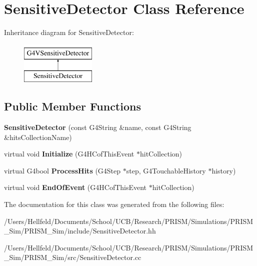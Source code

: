 \hypertarget{class_sensitive_detector}{}\section{Sensitive\+Detector Class Reference}
\label{class_sensitive_detector}
Inheritance diagram for Sensitive\+Detector\+:\begin{figure}[H]
\begin{center}
\leavevmode
\includegraphics[height=2.000000cm]{class_sensitive_detector}
\end{center}
\end{figure}
\subsection*{Public Member Functions}
\begin{DoxyCompactItemize}
\item 
\hypertarget{class_sensitive_detector_ac88a17313a09d79b33525ebd71d0bcfd}{}\label{class_sensitive_detector_ac88a17313a09d79b33525ebd71d0bcfd} 
{\bfseries Sensitive\+Detector} (const G4\+String \&name, const G4\+String \&hits\+Collection\+Name)
\item 
\hypertarget{class_sensitive_detector_ac8d4fb05e49fbd3d7036723cf7c6afe4}{}\label{class_sensitive_detector_ac8d4fb05e49fbd3d7036723cf7c6afe4} 
virtual void {\bfseries Initialize} (G4\+H\+Cof\+This\+Event $\ast$hit\+Collection)
\item 
\hypertarget{class_sensitive_detector_a0d76f2cb50f6b3736e80d0aa99ad8ccd}{}\label{class_sensitive_detector_a0d76f2cb50f6b3736e80d0aa99ad8ccd} 
virtual G4bool {\bfseries Process\+Hits} (G4\+Step $\ast$step, G4\+Touchable\+History $\ast$history)
\item 
\hypertarget{class_sensitive_detector_a158761c11c808dc5e3724f28893e7df1}{}\label{class_sensitive_detector_a158761c11c808dc5e3724f28893e7df1} 
virtual void {\bfseries End\+Of\+Event} (G4\+H\+Cof\+This\+Event $\ast$hit\+Collection)
\end{DoxyCompactItemize}


The documentation for this class was generated from the following files\+:\begin{DoxyCompactItemize}
\item 
/\+Users/\+Hellfeld/\+Documents/\+School/\+U\+C\+B/\+Research/\+P\+R\+I\+S\+M/\+Simulations/\+P\+R\+I\+S\+M\+\_\+\+Sim/\+P\+R\+I\+S\+M\+\_\+\+Sim/include/Sensitive\+Detector.\+hh\item 
/\+Users/\+Hellfeld/\+Documents/\+School/\+U\+C\+B/\+Research/\+P\+R\+I\+S\+M/\+Simulations/\+P\+R\+I\+S\+M\+\_\+\+Sim/\+P\+R\+I\+S\+M\+\_\+\+Sim/src/Sensitive\+Detector.\+cc\end{DoxyCompactItemize}

